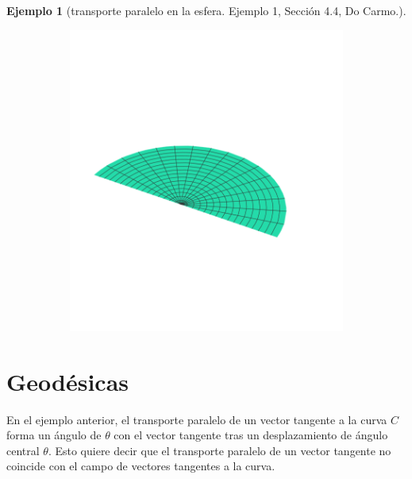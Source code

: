 \documentclass[spanish]{book}
\theoremstyle{definition}
\newtheorem*{ejem}{Ejemplo}
\begin{document}
\begin{ejem}[transporte paralelo en la esfera. Ejemplo 1, Sección 4.4, Do Carmo.]
\begin{figure}[H]
\begin{subfigure}{0.5\textwidth}
			\vspace{-2cm}
		\end{subfigure}
		\begin{subfigure}{0.5\textwidth}
			\centering
			\includegraphics[width=\linewidth]{gauss11}
			\vspace{-2cm}
		\end{subfigure}
	\end{figure}
\end{ejem}

\section{Geodésicas}
En el ejemplo anterior, el transporte paralelo de un vector tangente a la curva $C$ forma un ángulo de $\theta$ con el vector tangente tras un desplazamiento de ángulo central $\theta$. Esto quiere decir que el transporte paralelo de un vector tangente no coincide con el campo de vectores tangentes a la curva.
\end{document}

